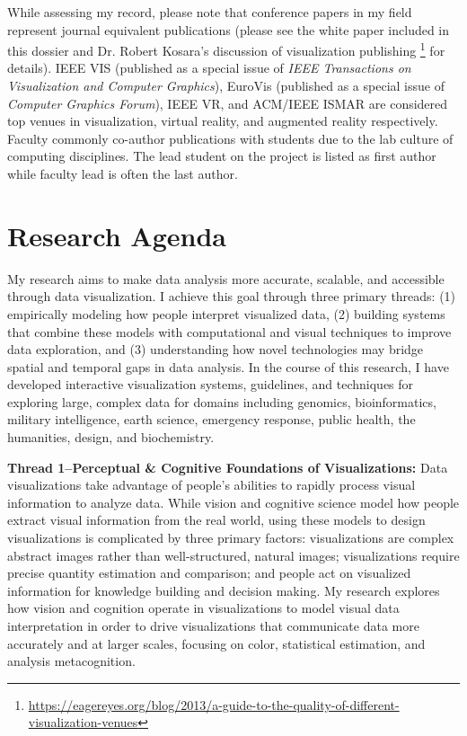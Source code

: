 \documentclass[11pt]{article}
\begin{document}
While assessing my record, please note that conference papers in my field represent journal equivalent publications (please see the white paper included in this dossier and Dr. Robert Kosara's discussion of visualization publishing \footnote{\url{https://eagereyes.org/blog/2013/a-guide-to-the-quality-of-different-visualization-venues}} for details). IEEE VIS (published as a special issue of \emph{IEEE Transactions on Visualization and Computer Graphics}), EuroVis (published as a special issue of \emph{Computer Graphics Forum}), IEEE VR, and ACM/IEEE ISMAR are considered top venues in visualization, virtual reality, and augmented reality respectively. Faculty commonly co-author publications with students due to the lab culture of computing disciplines. The lead student on the project is listed as first author while faculty lead is often the last author. 




\section*{Research Agenda}
My research aims to make data analysis more accurate, scalable, and accessible through data visualization. I achieve this goal through three primary threads: (1) empirically modeling how people interpret visualized data, (2) building systems that combine these models with computational and visual techniques to improve data exploration, and (3) understanding how novel technologies may bridge spatial and temporal gaps in data analysis. In the course of this research, I have 
developed interactive visualization systems, guidelines, and techniques for exploring large, complex data for domains including genomics, bioinformatics, military intelligence, earth science, emergency response, public health, the humanities, design, and biochemistry. 

\textbf{Thread 1--Perceptual \& Cognitive Foundations of Visualizations: }
Data visualizations take advantage of people's abilities to rapidly process visual information to analyze data. While vision and cognitive science model how people extract visual information from the real world, using these models to design visualizations is complicated by three primary factors: visualizations are complex abstract images rather than well-structured, natural images; visualizations require precise quantity estimation and comparison; and people act on visualized information for knowledge building and decision making. My research explores how vision and cognition operate in visualizations to model visual data interpretation in order to drive visualizations that communicate data more accurately and at larger scales, focusing on color, statistical estimation, and analysis metacognition. 
\end{document}
